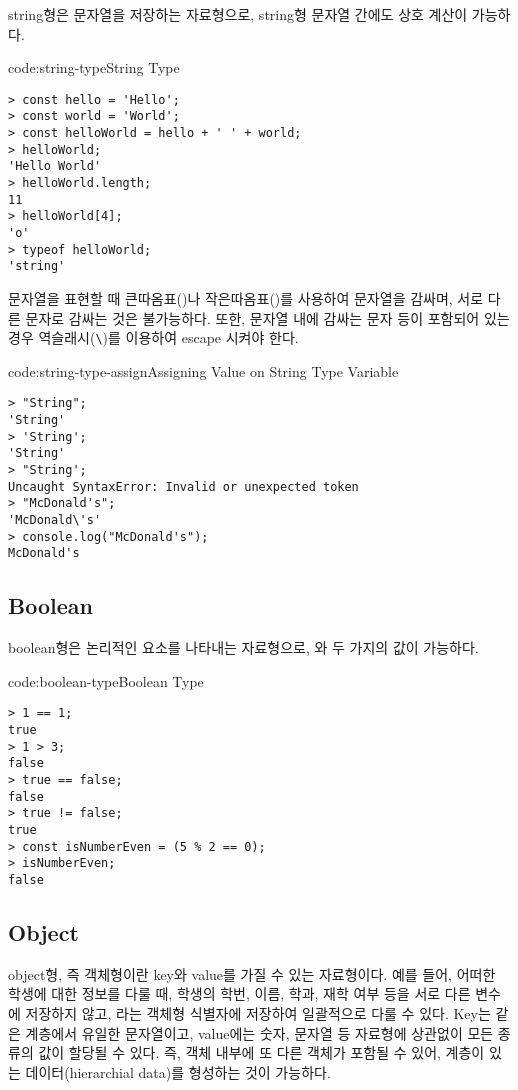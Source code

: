 string형은 문자열을 저장하는 자료형으로, string형 문자열 간에도 상호 계산이 가능하다.

\begin{codeenv}{code:string-type}{String Type}\begin{verbatim}
> const hello = 'Hello';
> const world = 'World';
> const helloWorld = hello + ' ' + world;
> helloWorld;
'Hello World'
> helloWorld.length;
11
> helloWorld[4];
'o'
> typeof helloWorld;
'string'
\end{verbatim}
\end{codeenv}

문자열을 표현할 때 큰따옴표()나 작은따옴표()를 사용하여 문자열을 감싸며, 서로 다른 문자로 감싸는 것은 불가능하다. 또한, 문자열 내에 감싸는 문자 등이 포함되어 있는 경우 역슬래시(\verb|\|)를 이용하여 escape 시켜야 한다.

\begin{codeenv}{code:string-type-assign}{Assigning Value on String Type Variable}\begin{verbatim}
> "String";
'String'
> 'String';
'String'
> "String';
Uncaught SyntaxError: Invalid or unexpected token
> "McDonald's";
'McDonald\'s'
> console.log("McDonald's");
McDonald's
\end{verbatim}
\end{codeenv}

\subsection*{Boolean}

boolean형은 논리적인 요소를 나타내는 자료형으로, 와  두 가지의 값이 가능하다.

\begin{codeenv}{code:boolean-type}{Boolean Type}\begin{verbatim}
> 1 == 1;
true
> 1 > 3;
false
> true == false;
false
> true != false;
true
> const isNumberEven = (5 % 2 == 0);
> isNumberEven;
false
\end{verbatim}
\end{codeenv}

\subsection*{Object}

object형, 즉 객체형이란 key와 value를 가질 수 있는 자료형이다. 예를 들어, 어떠한 학생에 대한 정보를 다룰 때, 학생의 학번, 이름, 학과, 재학 여부 등을 서로 다른 변수에 저장하지 않고, 라는 객체형 식별자에 저장하여 일괄적으로 다룰 수 있다. Key는 같은 계층에서 유일한 문자열이고, value에는 숫자, 문자열 등 자료형에 상관없이 모든 종류의 값이 할당될 수 있다. 즉, 객체 내부에 또 다른 객체가 포함될 수 있어, 계층이 있는 데이터(hierarchial data)를 형성하는 것이 가능하다.

